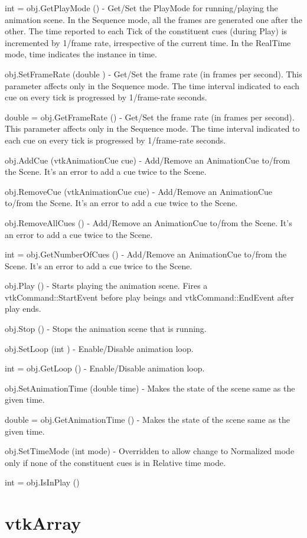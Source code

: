 \begin{DoxyItemize}
\item {\ttfamily int = obj.\-Get\-Play\-Mode ()} -\/ Get/\-Set the Play\-Mode for running/playing the animation scene. In the Sequence mode, all the frames are generated one after the other. The time reported to each Tick of the constituent cues (during Play) is incremented by 1/frame rate, irrespective of the current time. In the Real\-Time mode, time indicates the instance in time.  
\item {\ttfamily obj.\-Set\-Frame\-Rate (double )} -\/ Get/\-Set the frame rate (in frames per second). This parameter affects only in the Sequence mode. The time interval indicated to each cue on every tick is progressed by 1/frame-\/rate seconds.  
\item {\ttfamily double = obj.\-Get\-Frame\-Rate ()} -\/ Get/\-Set the frame rate (in frames per second). This parameter affects only in the Sequence mode. The time interval indicated to each cue on every tick is progressed by 1/frame-\/rate seconds.  
\item {\ttfamily obj.\-Add\-Cue (vtk\-Animation\-Cue cue)} -\/ Add/\-Remove an Animation\-Cue to/from the Scene. It's an error to add a cue twice to the Scene.  
\item {\ttfamily obj.\-Remove\-Cue (vtk\-Animation\-Cue cue)} -\/ Add/\-Remove an Animation\-Cue to/from the Scene. It's an error to add a cue twice to the Scene.  
\item {\ttfamily obj.\-Remove\-All\-Cues ()} -\/ Add/\-Remove an Animation\-Cue to/from the Scene. It's an error to add a cue twice to the Scene.  
\item {\ttfamily int = obj.\-Get\-Number\-Of\-Cues ()} -\/ Add/\-Remove an Animation\-Cue to/from the Scene. It's an error to add a cue twice to the Scene.  
\item {\ttfamily obj.\-Play ()} -\/ Starts playing the animation scene. Fires a vtk\-Command\-::\-Start\-Event before play beings and vtk\-Command\-::\-End\-Event after play ends.  
\item {\ttfamily obj.\-Stop ()} -\/ Stops the animation scene that is running.  
\item {\ttfamily obj.\-Set\-Loop (int )} -\/ Enable/\-Disable animation loop.  
\item {\ttfamily int = obj.\-Get\-Loop ()} -\/ Enable/\-Disable animation loop.  
\item {\ttfamily obj.\-Set\-Animation\-Time (double time)} -\/ Makes the state of the scene same as the given time.  
\item {\ttfamily double = obj.\-Get\-Animation\-Time ()} -\/ Makes the state of the scene same as the given time.  
\item {\ttfamily obj.\-Set\-Time\-Mode (int mode)} -\/ Overridden to allow change to Normalized mode only if none of the constituent cues is in Relative time mode.  
\item {\ttfamily int = obj.\-Is\-In\-Play ()}  
\end{DoxyItemize}\hypertarget{vtkcommon_vtkarray}{}\section{vtk\-Array}\label{vtkcommon_vtkarray}
